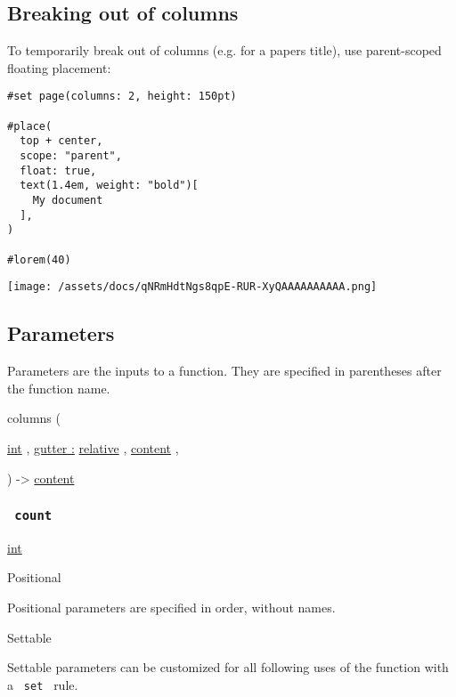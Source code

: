 \subsection{Breaking out of columns}\label{breaking-out}

To temporarily break out of columns (e.g. for a paper\textquotesingle s
title), use parent-scoped floating placement:

\begin{verbatim}
#set page(columns: 2, height: 150pt)

#place(
  top + center,
  scope: "parent",
  float: true,
  text(1.4em, weight: "bold")[
    My document
  ],
)

#lorem(40)
\end{verbatim}

\texttt{[image: /assets/docs/qNRmHdtNgs8qpE-RUR-XyQAAAAAAAAAA.png]}

\subsection{\texorpdfstring{{ Parameters
}}{ Parameters }}\label{parameters}

\label{parameters-tooltip}
Parameters are the inputs to a function. They are specified in
parentheses after the function name.

{ columns } (

{ \hyperref[parameters-count]{}
\href{/docs/reference/foundations/int/}{int} , } {
\hyperref[parameters-gutter]{gutter :}
\href{/docs/reference/layout/relative/}{relative} , } {
\href{/docs/reference/foundations/content/}{content} , }

) -\textgreater{} \href{/docs/reference/foundations/content/}{content}

\subsubsection{\texorpdfstring{\texttt{\ count\ }}{ count }}\label{parameters-count}

\href{/docs/reference/foundations/int/}{int}

{{ Positional }}

\label{parameters-count-positional-tooltip}
Positional parameters are specified in order, without names.

{{ Settable }}

\label{parameters-count-settable-tooltip}
Settable parameters can be customized for all following uses of the
function with a \texttt{\ set\ } rule.

